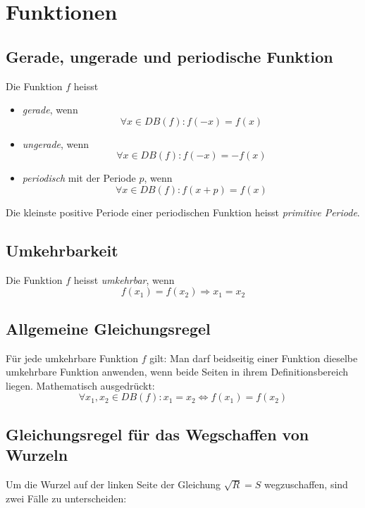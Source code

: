 \section{Funktionen}

\subsection{Gerade, ungerade und periodische Funktion}

Die Funktion $f$ heisst

\begin{itemize}
	\item \textit{gerade}, wenn \[\forall x \in DB(f): f(-x) = f(x)\]
	\item \textit{ungerade}, wenn \[\forall x \in DB(f): f(-x) = -f(x)\]
	\item \textit{periodisch} mit der Periode $p$, wenn \[\forall x \in DB(f): f(x + p) = f(x)\]
\end{itemize}

Die kleinste positive Periode einer periodischen Funktion heisst \textit{primitive Periode}.


\subsection{Umkehrbarkeit}

Die Funktion $f$ heisst \textit{umkehrbar}, wenn
%
\begin{displaymath}
	f(x_1) = f(x_2) \Rightarrow x_1 = x_2
\end{displaymath}

\subsection{Allgemeine Gleichungsregel}

Für jede umkehrbare Funktion $f$ gilt: Man darf beidseitig einer Funktion dieselbe umkehrbare
Funktion anwenden, wenn beide Seiten in ihrem Definitionsbereich liegen. Mathematisch ausgedrückt:
%
\begin{displaymath}
	\forall x_1, x_2 \in DB(f): x_1 = x_2 \Leftrightarrow f(x_1) = f(x_2)
\end{displaymath}


\subsection{Gleichungsregel für das Wegschaffen von Wurzeln}

Um die Wurzel auf der linken Seite der Gleichung $\sqrt{R} = S$ wegzuschaffen, sind zwei Fälle zu unterscheiden:

